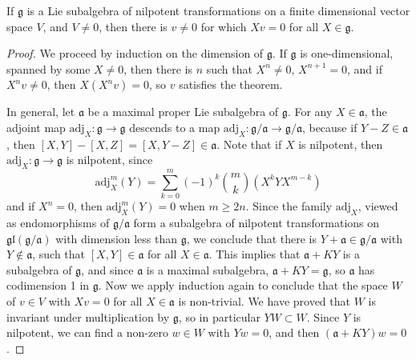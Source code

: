 \begin{lemma}
    If $\mathfrak{g}$ is a Lie subalgebra of nilpotent transformations on a finite dimensional vector space $V$, and $V \neq 0$, then there is $v \neq 0$ for which $Xv = 0$ for all $X \in \mathfrak{g}$.
\end{lemma}
\begin{proof}
    We proceed by induction on the dimension of $\mathfrak{g}$. If $\mathfrak{g}$ is one-dimensional, spanned by some $X \neq 0$, then there is $n$ such that $X^n \neq 0$, $X^{n+1} = 0$, and if $X^n v \neq 0$, then $X(X^n v) = 0$, so $v$ satisfies the theorem.

    In general, let $\mathfrak{a}$ be a maximal proper Lie subalgebra of $\mathfrak{g}$. For any $X \in \mathfrak{a}$, the adjoint map $\text{adj}_X: \mathfrak{g} \to \mathfrak{g}$ descends to a map $\text{adj}_X: \mathfrak{g}/\mathfrak{a} \to \mathfrak{g}/\mathfrak{a}$, because if $Y - Z \in \mathfrak{a}$, then $[X,Y] - [X,Z] = [X,Y-Z] \in \mathfrak{a}$. Note that if $X$ is nilpotent, then $\text{adj}_X: \mathfrak{g} \to \mathfrak{g}$ is nilpotent, since
    \[ \text{adj}^m_X(Y) = \sum_{k = 0}^m (-1)^k {m \choose k} (X^kYX^{m-k}) \]
    and if $X^n = 0$, then $\text{adj}^m_X(Y) = 0$ when $m \geq 2n$. Since the family $\text{adj}_X$, viewed as endomorphisms of $\mathfrak{g}/\mathfrak{a}$ form a subalgebra of nilpotent transformations on $\mathfrak{gl}(\mathfrak{g}/\mathfrak{a})$ with dimension less than $\mathfrak{g}$, we conclude that there is $Y + \mathfrak{a} \in \mathfrak{g}/\mathfrak{a}$ with $Y \not \in \mathfrak{a}$, such that $[X,Y] \in \mathfrak{a}$ for all $X \in \mathfrak{a}$. This implies that $\mathfrak{a} + KY$ is a subalgebra of $\mathfrak{g}$, and since $\mathfrak{a}$ is a maximal subalgebra, $\mathfrak{a} + KY = \mathfrak{g}$, so $\mathfrak{a}$ has codimension 1 in $\mathfrak{g}$. Now we apply induction again to conclude that the space $W$ of $v \in V$ with $Xv = 0$ for all $X \in \mathfrak{a}$ is non-trivial. We have proved that $W$ is invariant under multiplication by $\mathfrak{g}$, so in particular $YW \subset W$. Since $Y$ is nilpotent, we can find a non-zero $w \in W$ with $Yw = 0$, and then $(\mathfrak{a} + KY)w = 0$.
\end{proof}

